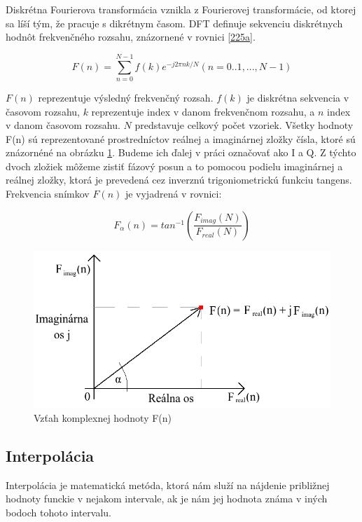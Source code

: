     Diskrétna Fourierova transformácia vznikla z Fourierovej transformácie, od ktorej sa líší tým, že pracuje s dikrétnym časom. DFT definuje sekvenciu diskrétnych hodnôt frekvenčného rozsahu, znázornené v rovnici \ref{225a}.

    \begin{equation} \label{eq:225a}
      F(n) = \sum\limits_{n = 0}^{N-1} f(k) e^{-j2\pi n k / N}  
      (n = 0..1,...,N-1)
    \end{equation}

    $F(n)$ reprezentuje výsledný frekvenčný rozsah. $f(k)$ je diskrétna sekvencia v časovom rozsahu, $k$ reprezentuje index v danom frekvenčnom rozsahu, a $n$ index v danom časovom rozsahu. $N$ predstavuje celkový počet vzoriek. Všetky hodnoty F(n) sú reprezentované prostredníctov reálnej a imaginárnej zložky čísla, ktoré sú znázornéné na obrázku \ref{fig:real_imag}. Budeme ich ďalej v práci označovať ako I a Q. Z týchto dvoch zložiek môžeme zistiť fázový posun a to pomocou podielu imaginárnej a reálnej zložky, ktorá je prevedená cez inverznú trigoniometrickú funkciu tangens. Frekvencia snímkov $F(n)$ je vyjadrená v rovnici: 

    \begin{equation} \label{eq:225b}
      F_{\alpha}(n) = tan^{-1}(\frac{F_{imag}(N)}{F_{real}(N)})
    \end{equation}\newline   

    \begin{figure}[h!]
        \centering
        \includegraphics[width=.85\textwidth]{obrazky-figures/real_imag.png}
        \caption{Vzťah komplexnej hodnoty F(n)\cite{undestandingsignals}}
        \label{fig:real_imag}
    \end{figure}
   
  \subsection{Interpolácia}
    \hspace{0.6cm} Interpolácia je matematická metóda, ktorá nám služí na nájdenie približnej hodnoty funckie v nejakom intervale, ak je nám jej hodnota známa v iných bodoch tohoto intervalu.
    
